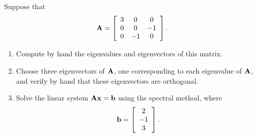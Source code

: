 Suppose that
  \[ {\bf A} = \left[\begin{array}{ccc} 3 & 0 & 0 \\ 0 & 0 & -1 \\ 0 & -1 & 0\end{array}\right].\]
\begin{enumerate} 
\item Compute by hand the eigenvalues and eigenvectors of this matrix.
\\
\item Choose three eigenvectors of ${\bf A}$, one corresponding to each eigenvalue of ${\bf A}$, and verify by hand that these eigenvectors are orthogonal.
\\
\item Solve the linear system ${\bf A}{\bf x} = {\bf b}$ using the spectral method, where
       \[ {\bf b} = \left[\begin{array}{c} 2 \\ -1 \\ 3\end{array}\right].\]
\end{enumerate}  



